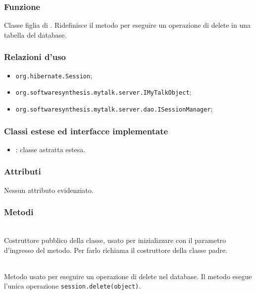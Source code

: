 \subsubsection*{Funzione}
Classe figlia di . Ridefinisce il metodo  per eseguire un operazione di delete in una tabella del database.

\subsubsection*{Relazioni d'uso}

\begin{itemize}
		\item \texttt{org.hibernate.Session};
		\item \texttt{org.softwaresynthesis.mytalk.server.IMyTalkObject};
		\item \texttt{org.softwaresynthesis.mytalk.server.dao.ISessionManager};
\end{itemize}

\subsubsection*{Classi estese ed interfacce implementate}

\begin{itemize}
	\item {}: classe astratta estesa.
\end{itemize}

\subsubsection*{Attributi}

Nessun attributo evidenziato.

\subsubsection*{Metodi}

\begin{description}
	\item{}\\
	Costruttore pubblico della classe, usato per inizializzare  con il parametro d'ingresso del metodo. Per farlo richiama il costruttore della classe padre.

	\item{}\\
	Metodo usato per eseguire un operazione di delete nel database. Il metodo esegue l'unica operazione \verb|session.delete(object)|.

\end{description}

